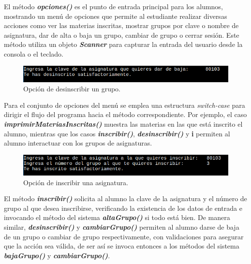 \documentclass[a4paper,12pt]{article}
\begin{document}
El método \textbf{\textit{opciones()}} es el punto de entrada principal para los alumnos, mostrando un menú de opciones que permite al estudiante realizar diversas acciones como ver las materias inscritas, mostrar grupos por clave o nombre de asignatura, dar de alta o baja un grupo, cambiar de grupo o cerrar sesión. Este método utiliza un objeto \textbf{\textit{Scanner}} para capturar la entrada del usuario desde la consola o el teclado.

\begin{figure}[ht]
    \centering
    \includegraphics[width=.9\textwidth]{media/desinscribir_asignatura.png}
    \caption{Opción de desinscribir un grupo.}
    \label{fig:desinscribir_asig}
\end{figure}

Para el conjunto de opciones del menú se emplea una estructura \textit{switch-case} para dirigir el flujo del programa hacia el método correspondiente. Por ejemplo, el caso \textbf{\textit{imprimirMateriasInscritas()}} muestra las materias en las que está inscrito el alumno, mientras que los casos \textbf{\textit{inscribir()}}, \textbf{\textit{desinscribir()}} y \textbf{i} permiten al alumno interactuar con los grupos de asignaturas.

\begin{figure}[ht]
    \centering
    \includegraphics[width=.9\textwidth]{media/inscribir_asignatura.png}
    \caption{Opción de inscribir una asignatura.}
    \label{fig:inscribir}
\end{figure}

El método \textbf{\textit{inscribir()}} solicita al alumno la clave de la asignatura y el número de grupo al que desea inscribirse, verificando la existencia de los datos de entrada e invocando el método del sistema \textbf{\textit{altaGrupo()}} si todo está bien. De manera similar, \textbf{\textit{desinscribir()}} y \textbf{\textit{cambiarGrupo()}} permiten al alumno darse de baja de un grupo o cambiar de grupo respectivamente, con validaciones para asegurar que la acción sea válida, de ser así se invoca entonces a los métodos del sistema \textbf{\textit{bajaGrupo()}} y \textbf{\textit{cambiarGrupo()}}.
\end{document}

